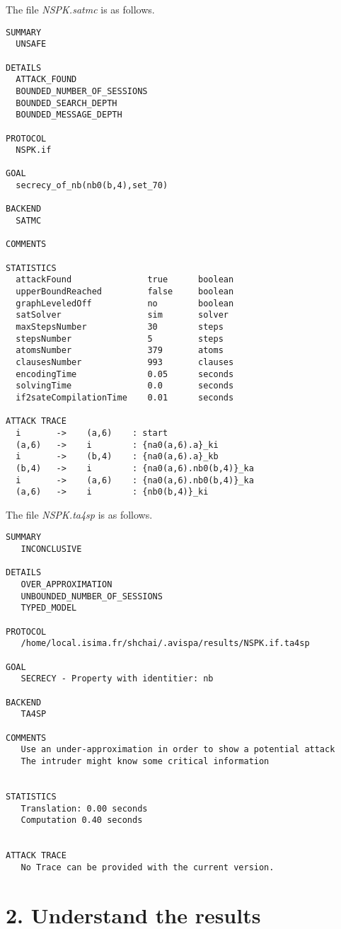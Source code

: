 \documentclass[a4paper, 12pt]{report}
\begin{document}
        The file \emph{NSPK.satmc} is as follows.
        \begin{lstlisting}[frame=single]
SUMMARY
  UNSAFE

DETAILS
  ATTACK_FOUND
  BOUNDED_NUMBER_OF_SESSIONS
  BOUNDED_SEARCH_DEPTH
  BOUNDED_MESSAGE_DEPTH

PROTOCOL
  NSPK.if

GOAL
  secrecy_of_nb(nb0(b,4),set_70)

BACKEND
  SATMC

COMMENTS

STATISTICS
  attackFound               true      boolean
  upperBoundReached         false     boolean
  graphLeveledOff           no        boolean
  satSolver                 sim       solver
  maxStepsNumber            30        steps
  stepsNumber               5         steps
  atomsNumber               379       atoms
  clausesNumber             993       clauses
  encodingTime              0.05      seconds
  solvingTime               0.0       seconds
  if2sateCompilationTime    0.01      seconds

ATTACK TRACE
  i       ->    (a,6)    : start
  (a,6)   ->    i        : {na0(a,6).a}_ki
  i       ->    (b,4)    : {na0(a,6).a}_kb
  (b,4)   ->    i        : {na0(a,6).nb0(b,4)}_ka
  i       ->    (a,6)    : {na0(a,6).nb0(b,4)}_ka
  (a,6)   ->    i        : {nb0(b,4)}_ki
        \end{lstlisting}
        The file \emph{NSPK.ta4sp} is as follows.
        \begin{lstlisting}[frame=single]
SUMMARY
   INCONCLUSIVE

DETAILS
   OVER_APPROXIMATION
   UNBOUNDED_NUMBER_OF_SESSIONS
   TYPED_MODEL

PROTOCOL
   /home/local.isima.fr/shchai/.avispa/results/NSPK.if.ta4sp

GOAL
   SECRECY - Property with identitier: nb

BACKEND
   TA4SP

COMMENTS
   Use an under-approximation in order to show a potential attack
   The intruder might know some critical information
 

STATISTICS
   Translation: 0.00 seconds
   Computation 0.40 seconds


ATTACK TRACE
   No Trace can be provided with the current version.
        \end{lstlisting}

    \section*{2. Understand the results}
\end{document}
